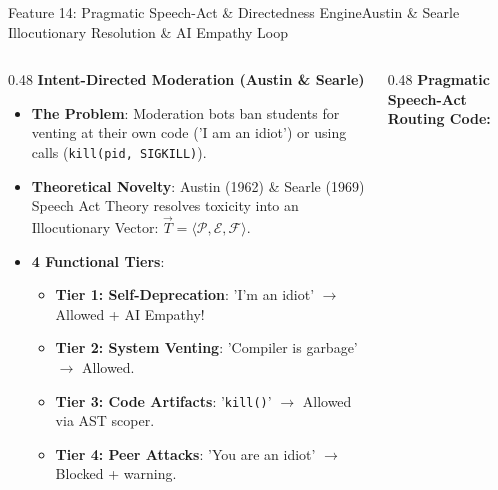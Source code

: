 \documentclass[aspectratio=169,10pt]{beamer}
\begin{document}
\begin{frame}[fragile,t]{Feature 14: Pragmatic Speech-Act \& Directedness Engine}{Austin \& Searle Illocutionary Resolution \& AI Empathy Loop}
  \begin{columns}[t]
    \begin{column}{0.48\textwidth}
      {\fontsize{9.0}{11.0}\selectfont\textbf{\textcolor{KoinexaRed}{Intent-Directed Moderation (Austin \& Searle)}}}\par\vspace{1.5pt}
      \begin{itemize}\setlength{\itemsep}{1.5pt}
        \item {\fontsize{8.0}{9.8}\selectfont \textbf{The Problem}: Moderation bots ban students for venting at their own code ('I am an idiot') or using calls (\texttt{kill(pid, SIGKILL)}).}
        \item {\fontsize{8.0}{9.8}\selectfont \textbf{Theoretical Novelty}: Austin (1962) \& Searle (1969) Speech Act Theory resolves toxicity into an Illocutionary Vector: $\vec{T} = \langle \mathcal{P}, \mathcal{E}, \mathcal{F} \rangle$.}
        \item {\fontsize{8.0}{9.8}\selectfont \textbf{4 Functional Tiers}:}
        \begin{itemize}\setlength{\itemsep}{0.8pt}
          \item {\fontsize{7.5}{9.2}\selectfont \textbf{Tier 1: Self-Deprecation}: 'I'm an idiot' $\to$ Allowed + AI Empathy!}
          \item {\fontsize{7.5}{9.2}\selectfont \textbf{Tier 2: System Venting}: 'Compiler is garbage' $\to$ Allowed.}
          \item {\fontsize{7.5}{9.2}\selectfont \textbf{Tier 3: Code Artifacts}: '\texttt{kill()}' $\to$ Allowed via AST scoper.}
          \item {\fontsize{7.5}{9.2}\selectfont \textbf{Tier 4: Peer Attacks}: 'You are an idiot' $\to$ Blocked + warning.}
        \end{itemize}
      \end{itemize}
    \end{column}
    \begin{column}{0.48\textwidth}
      {\fontsize{8.0}{10.0}\selectfont\textbf{\textcolor{KoinexaRed}{Pragmatic Speech-Act Routing Code:}}}
\begin{lstlisting}[language=Python]

\end{lstlisting}
\end{column}
\end{columns}
\end{frame}
\end{document}
